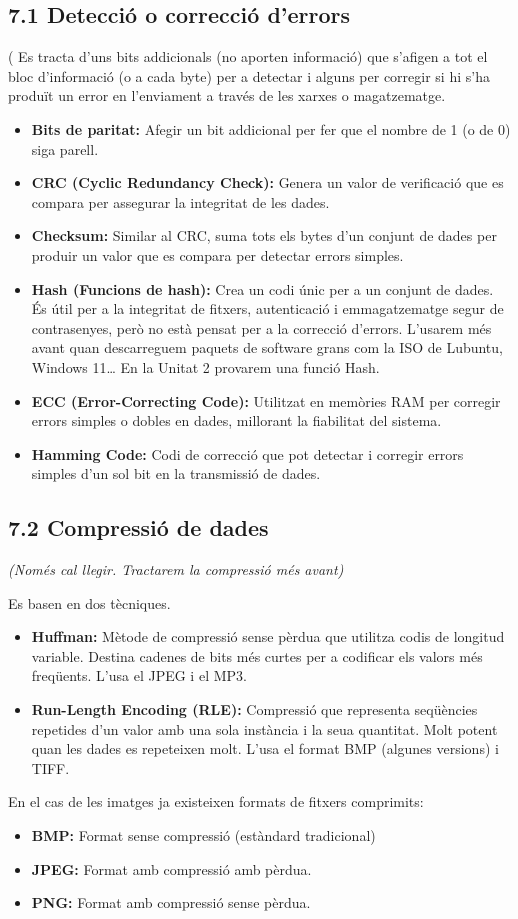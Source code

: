 \documentclass[
  12 pt,
  a4paper,
]{article}
\providecommand{\tightlist}{%
  \setlength{\itemsep}{0pt}\setlength{\parskip}{0pt}}
\begin{document}
\subsection{7.1 Detecció o correcció
d'errors}\label{detecciuxf3-o-correcciuxf3-derrors}

( Es tracta d'uns bits addicionals (no aporten informació) que s'afigen
a tot el bloc d'informació (o a cada byte) per a detectar i alguns per
corregir si hi s'ha produït un error en l'enviament a través de les
xarxes o magatzematge.

\begin{itemize}
\item
  \textbf{Bits de paritat:} Afegir un bit addicional per fer que el
  nombre de 1 (o de 0) siga parell.
\item
  \textbf{CRC (Cyclic Redundancy Check):} Genera un valor de verificació
  que es compara per assegurar la integritat de les dades.
\item
  \textbf{Checksum:} Similar al CRC, suma tots els bytes d'un conjunt de
  dades per produir un valor que es compara per detectar errors simples.
\item
  \textbf{Hash (Funcions de hash):} Crea un codi únic per a un conjunt
  de dades. És útil per a la integritat de fitxers, autenticació i
  emmagatzematge segur de contrasenyes, però no està pensat per a la
  correcció d'errors. L'usarem més avant quan descarreguem paquets de
  software grans com la ISO de Lubuntu, Windows 11\ldots{} En la Unitat
  2 provarem una funció Hash.
\item
  \textbf{ECC (Error-Correcting Code):} Utilitzat en memòries RAM per
  corregir errors simples o dobles en dades, millorant la fiabilitat del
  sistema.
\item
  \textbf{Hamming Code:} Codi de correcció que pot detectar i corregir
  errors simples d'un sol bit en la transmissió de dades.
\end{itemize}

\subsection{7.2 Compressió de dades}\label{compressiuxf3-de-dades}

\emph{(Només cal llegir. Tractarem la compressió més avant)}

Es basen en dos tècniques.

\begin{itemize}
\item
  \textbf{Huffman:} Mètode de compressió sense pèrdua que utilitza codis
  de longitud variable. Destina cadenes de bits més curtes per a
  codificar els valors més freqüents. L'usa el JPEG i el MP3.
\item
  \textbf{Run-Length Encoding (RLE):} Compressió que representa
  seqüències repetides d'un valor amb una sola instància i la seua
  quantitat. Molt potent quan les dades es repeteixen molt. L'usa el
  format BMP (algunes versions) i TIFF.
\end{itemize}

En el cas de les imatges ja existeixen formats de fitxers comprimits:

\begin{itemize}
\tightlist
\item
  \textbf{BMP:} Format sense compressió (estàndard tradicional)
\item
  \textbf{JPEG:} Format amb compressió amb pèrdua.
\item
  \textbf{PNG:} Format amb compressió sense pèrdua.
\end{itemize}
\end{document}
